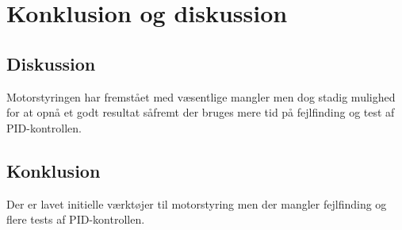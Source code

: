 \chapter{Konklusion og diskussion}
\label{cha:konkl-og-disk}

\section{Diskussion}
\label{sec:diskussion}

Motorstyringen har fremstået med væsentlige mangler men dog stadig mulighed for at opnå et godt resultat såfremt der bruges mere tid på fejlfinding og test af PID-kontrollen.


\section{Konklusion}
\label{sec:konklusion}

Der er lavet initielle værktøjer til motorstyring men der mangler fejlfinding og flere tests af PID-kontrollen.


